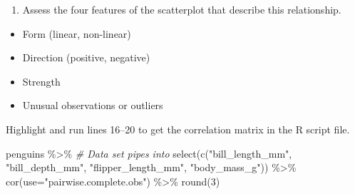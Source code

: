 \documentclass[
]{report}
\newenvironment{Shaded}{\begin{snugshade}}{\end{snugshade}}
\newcommand{\AttributeTok}[1]{\textcolor[rgb]{0.77,0.63,0.00}{#1}}
\newcommand{\CommentTok}[1]{\textcolor[rgb]{0.56,0.35,0.01}{\textit{#1}}}
\newcommand{\DecValTok}[1]{\textcolor[rgb]{0.00,0.00,0.81}{#1}}
\newcommand{\FunctionTok}[1]{\textcolor[rgb]{0.00,0.00,0.00}{#1}}
\newcommand{\NormalTok}[1]{#1}
\newcommand{\SpecialCharTok}[1]{\textcolor[rgb]{0.00,0.00,0.00}{#1}}
\newcommand{\StringTok}[1]{\textcolor[rgb]{0.31,0.60,0.02}{#1}}
\providecommand{\tightlist}{%
  \setlength{\itemsep}{0pt}\setlength{\parskip}{0pt}}
\begin{document}
\begin{enumerate}
\def\labelenumi{\arabic{enumi}.}
\tightlist
\item
  Assess the four features of the scatterplot that describe this relationship.
  \vspace{1mm}
\end{enumerate}

\begin{itemize}
\tightlist
\item
  Form (linear, non-linear)
\end{itemize}

\vspace{.1in}

\begin{itemize}
\tightlist
\item
  Direction (positive, negative)
\end{itemize}

\vspace{.1in}

\begin{itemize}
\tightlist
\item
  Strength
\end{itemize}

\vspace{.1in}

\begin{itemize}
\tightlist
\item
  Unusual observations or outliers
\end{itemize}

\vspace{.1in}

Highlight and run lines 16--20 to get the correlation matrix in the R script file.

\begin{Shaded}
\begin{Highlighting}[]
\NormalTok{penguins }\SpecialCharTok{\%\textgreater{}\%}  \CommentTok{\# Data set pipes into}
  \FunctionTok{select}\NormalTok{(}\FunctionTok{c}\NormalTok{(}\StringTok{"bill\_length\_mm"}\NormalTok{, }\StringTok{"bill\_depth\_mm"}\NormalTok{, }
           \StringTok{"flipper\_length\_mm"}\NormalTok{, }\StringTok{"body\_mass\_g"}\NormalTok{)) }\SpecialCharTok{\%\textgreater{}\%}
  \FunctionTok{cor}\NormalTok{(}\AttributeTok{use=}\StringTok{"pairwise.complete.obs"}\NormalTok{) }\SpecialCharTok{\%\textgreater{}\%}
  \FunctionTok{round}\NormalTok{(}\DecValTok{3}\NormalTok{)}
\end{Highlighting}
\end{Shaded}
\end{document}
